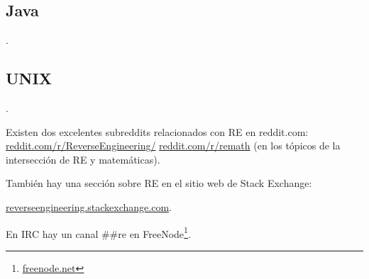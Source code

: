 
\subsection{Java}

\JavaBook.

\subsection{UNIX}

\TAOUP




\HenryWarren.

Existen dos excelentes subreddits relacionados con \ac{RE} en reddit.com:
\href{http://www.reddit.com/r/ReverseEngineering/}{reddit.com/r/ReverseEngineering/} \ESph{}
\href{http://www.reddit.com/r/remath}{reddit.com/r/remath}
(en los t\'opicos de la intersecci\'on de \ac{RE} y matem\'aticas).

Tambi\'en hay una secci\'on sobre \ac{RE} en el sitio web de Stack Exchange:

\par
\href{http://reverseengineering.stackexchange.com/}{reverseengineering.stackexchange.com}.

En IRC hay un canal \#\#re en
FreeNode\footnote{\href{https://freenode.net/}{freenode.net}}.

